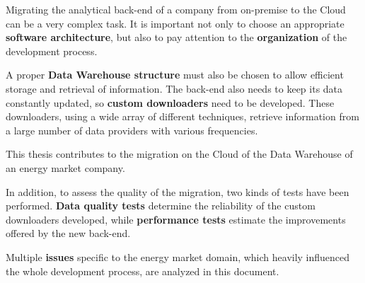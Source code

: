     Migrating the analytical back-end of a company from on-premise to the Cloud can be a very complex task.
    It is important not only to choose an appropriate \textbf{software architecture}, but also to pay attention to the \textbf{organization} of the development process.
    
    A proper \textbf{Data Warehouse structure} must also be chosen to allow efficient storage and retrieval of information.
    The back-end also needs to keep its data constantly updated, so \textbf{custom downloaders} need to be developed.
    These downloaders, using a wide array of different techniques, retrieve information from a large number of data providers with various frequencies.
    
    This thesis contributes to the migration on the Cloud of the Data Warehouse of an energy market company.
    
    In addition, to assess the quality of the migration, two kinds of tests have been performed.
    \textbf{Data quality tests} determine the reliability of the custom downloaders developed, while \textbf{performance tests} estimate the improvements offered by the new back-end.
    
    Multiple \textbf{issues} specific to the energy market domain, which heavily influenced the whole development process, are analyzed in this document. 
    